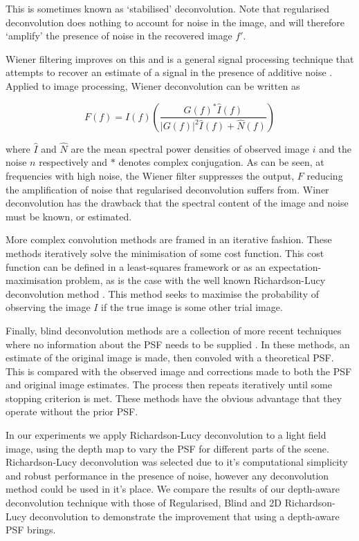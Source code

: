 This is sometimes known as \enquote*{stabilised} deconvolution.
Note that regularised deconvolution does nothing to account for noise in the image, and will therefore \enquote*{amplify} the presence of noise in the recovered image $f'$.

Wiener filtering improves on this and is a general signal processing technique that attempts to recover an estimate of a signal in the presence of additive noise \cite{wiener1964extrapolation}.
Applied to image processing, Wiener deconvolution can be written as

\begin{equation}
\label{eq:wiener_filter}
F(f) = I(f) \left( \frac{G(f)^* \hat{I}(f)}{\left| G(f) \right|^2 \hat{I}(f) + \hat{N}(f) } \right)
\end{equation}

\noindent
where $\hat{I}$ and $\hat{N}$ are the mean spectral power densities of observed image $i$ and the noise $n$ respectively and $*$ denotes complex conjugation.
As can be seen, at frequencies with high noise, the Wiener filter suppresses the output, $F$ reducing the amplification of noise that regularised deconvolution suffers from.
Winer deconvolution has the drawback that the spectral content of the image and noise must be known, or estimated.

More complex convolution methods are framed in an iterative fashion.
These methods iteratively solve the minimisation of some cost function.
This cost function can be defined in a least-squares framework \cite{ng99anew} or as an expectation-maximisation problem, as is the case with the well known Richardson-Lucy deconvolution method \cite{richarson1972bayesian}.
This method seeks to maximise the probability of observing the image $I$ if the true image is some other trial image.

Finally, blind deconvolution methods are a collection of more recent techniques where no information about the PSF needs to be supplied \cite{bell1995information, ayers1988iterative}.
In these methods, an estimate of the original image is made, then convoled with a theoretical PSF.
This is compared with the observed image and corrections made to both the PSF and original image estimates.
The process then repeats iteratively until some stopping criterion is met.
These methods have the obvious advantage that they operate without the prior PSF.

In our experiments we apply Richardson-Lucy deconvolution to a light field image, using the depth map to vary the PSF for different parts of the scene.
Richardson-Lucy deconvolution was selected due to it's computational simplicity and robust performance in the presence of noise, however any deconvolution method could be used in it's place.
We compare the results of our depth-aware deconvolution technique with those of Regularised, Blind and 2D Richardson-Lucy deconvolution to demonstrate the improvement that using a depth-aware PSF brings.

